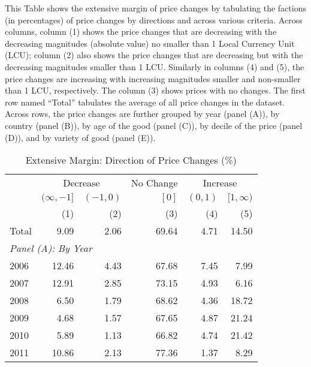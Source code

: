 
\clearpage
\begin{table}
	\caption{Extensive Margin: Direction of Price Changes (\%)}\label{tbl:ext}
	{\small This Table shows the extensive margin of price changes by tabulating the factions (in percentages) of price changes by directions and across various criteria. Across columns, column (1) shows the price changes that are decreasing with the decreasing magnitudes (absolute value) no smaller than 1 Local Currency Unit (LCU); column (2) also shows the price changes that are decreasing but with the decreasing magnitudes smaller than 1 LCU. Similarly in columns (4) and (5), the price changes are increasing with increasing magnitudes smaller and non-smaller than 1 LCU, respectively. The column (3) shows prices with no changes. The first row named ``Total'' tabulates the average of all price changes in the dataset. Across rows, the price changes are further grouped by year (panel (A)), by country (panel (B)), by age of the good (panel (C)), by decile of the price (panel (D)), and by variety of good (panel (E)).}
	\begin{tabular}{lrrrrr}
		\hline\hline
		        & \multicolumn{2}{c}{Decrease} & No Change & \multicolumn{2}{c}{Increase} \\ \cline{2-3}\cline{5-6}
		        & $ (\infty,-1] $ & $ (-1,0) $ &     $ [0] $ & $ (0,1) $ &   $ [1,\infty) $ \\
		        &             (1) &        (2) &       (3) &       (4) &              (5) \\ \hline\hline
		Total   &            9.09 &       2.06 &     69.64 &      4.71 &            14.50 \\ \hline\hline
		\multicolumn{6}{l}{\textit{Panel (A): By Year}}                                   \\ \hline
		2006    &           12.46 &       4.43 &     67.68 &      7.45 &             7.99 \\
		2007    &           12.91 &       2.85 &     73.15 &      4.93 &             6.16 \\
		2008    &            6.50 &       1.79 &     68.62 &      4.36 &            18.72 \\
		2009    &            4.68 &       1.57 &     67.65 &      4.87 &            21.24 \\
		2010    &            5.89 &       1.13 &     66.82 &      4.74 &            21.42 \\
		2011    &           10.86 &       2.13 &     77.36 &      1.37 &             8.29 \\

\end{tabular}
\end{table}

